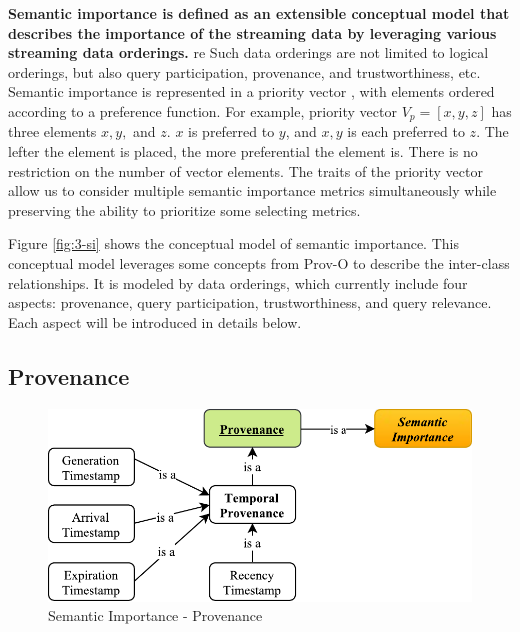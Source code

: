 \textbf{Semantic importance is defined as an extensible conceptual model that describes the importance of the streaming data by leveraging various streaming data orderings.}
re
Such data orderings are not limited to logical orderings, but also query participation, provenance, and trustworthiness, etc. 
Semantic importance is represented in a priority vector \cite{saaty2003decision}, with elements ordered according to a preference function.
For example, priority vector $V_{p} = [x, y, z]$ has three elements $x, y,$ and $z$.
$x$ is preferred to $y$, and $x, y$ is each preferred to $z$.
The lefter the element is placed, the more preferential the element is.  
There is no restriction on the number of vector elements. 
The traits of the priority vector allow us to consider multiple semantic importance metrics simultaneously while preserving the ability to prioritize some selecting metrics. 

Figure \ref{fig:3-si} shows the conceptual model of semantic importance. 
This conceptual model leverages some concepts from Prov-O \cite{lebo2013prov} to describe the inter-class relationships. 
It is modeled by data orderings, which currently include four aspects: provenance, query participation, trustworthiness, and query relevance.
Each aspect will be introduced in details below.
%
\subsection{Provenance}

\begin{figure}[!htbp]
	\centering
    \includegraphics[width=5in]{img/3-sip.pdf}
    \caption{Semantic Importance - Provenance}
    \label{fig:3-sip}
\end{figure}


